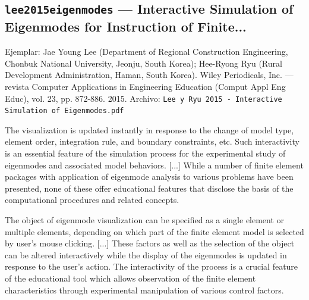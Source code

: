 \documentclass[11pt,a4paper]{article}
\newcommand{\campo}[1]{\textcolor{gris}{\footnotesize #1}}
\begin{document}
\subsection{\texttt{lee2015eigenmodes} --- Interactive Simulation of Eigenmodes for Instruction of Finite...}
{\footnotesize\campo{Ejemplar:} Jae Young Lee (Department of Regional Construction Engineering, Chonbuk National University, Jeonju, South Korea); Hee-Ryong Ryu (Rural Development Administration, Haman, South Korea). Wiley Periodicals, Inc. --- revista Computer Applications in Engineering Education (Comput Appl Eng Educ), vol. 23, pp. 872-886. 2015. \campo{Archivo:} \texttt{Lee y Ryu 2015 - Interactive Simulation of Eigenmodes.pdf}\par}\vspace{4pt}
\vspace{3pt}\noindent{\small\textbf{p.\ 872} \quad \campo{«La literatura sobre enseñanza del método coincide en que la simulación interactiva y la manipulación directa de los objetos matemáticos del MEF favorecen un aprendizaje más profundo que la mera exposición teórica o el uso de herramientas opacas» --- tesis/capitulos/01\_introduccion.tex:21 (cita sin localizador, compartida con...}}\par
\begin{pasaje}\footnotesize The visualization is updated instantly in response to the change of model type, element order, integration rule, and boundary constraints, etc. Such interactivity is an essential feature of the simulation process for the experimental study of eigenmodes and associated model behaviors. [...] While a number of finite element packages with application of eigenmode analysis to various problems have been presented, none of these offer educational features that disclose the basis of the computational procedures and related concepts.\end{pasaje}
\vspace{3pt}\noindent{\small\textbf{p.\ 874} \quad \campo{Refuerzo de la misma afirmación de 01\_introduccion.tex:21: la «manipulación directa» de los objetos matemáticos del MEF}}\par
\begin{pasaje}\footnotesize The object of eigenmode visualization can be specified as a single element or multiple elements, depending on which part of the finite element model is selected by user's mouse clicking. [...] These factors as well as the selection of the object can be altered interactively while the display of the eigenmodes is updated in response to the user's action. The interactivity of the process is a crucial feature of the educational tool which allows observation of the finite element characteristics through experimental manipulation of various control factors.\end{pasaje}
\end{document}
